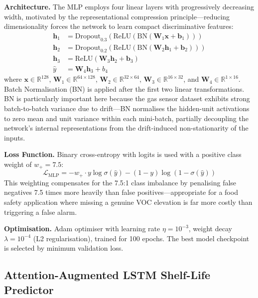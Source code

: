 \documentclass{ieeeaccess}
\begin{document}
\textbf{Architecture.} The MLP employs four linear layers with progressively decreasing width, motivated by the representational compression principle---reducing dimensionality forces the network to learn compact discriminative features:
\begin{align}
  \mathbf{h}_1 &= \text{Dropout}_{0.3}(\text{ReLU}(\text{BN}(\mathbf{W}_1 \mathbf{x} + \mathbf{b}_1))) \nonumber \\
  \mathbf{h}_2 &= \text{Dropout}_{0.2}(\text{ReLU}(\text{BN}(\mathbf{W}_2 \mathbf{h}_1 + \mathbf{b}_2))) \nonumber \\
  \mathbf{h}_3 &= \text{ReLU}(\mathbf{W}_3 \mathbf{h}_2 + \mathbf{b}_3) \nonumber \\
  \hat{y} &= \mathbf{W}_4 \mathbf{h}_3 + b_4
\end{align}
where $\mathbf{x} \in \mathbb{R}^{128}$, $\mathbf{W}_1 \in \mathbb{R}^{64 \times 128}$, $\mathbf{W}_2 \in \mathbb{R}^{32 \times 64}$, $\mathbf{W}_3 \in \mathbb{R}^{16 \times 32}$, and $\mathbf{W}_4 \in \mathbb{R}^{1 \times 16}$. Batch Normalisation (BN) is applied after the first two linear transformations. BN is particularly important here because the gas sensor dataset exhibits strong batch-to-batch variance due to drift---BN normalises the hidden-unit activations to zero mean and unit variance within each mini-batch, partially decoupling the network's internal representations from the drift-induced non-stationarity of the inputs.

\textbf{Loss Function.} Binary cross-entropy with logits is used with a positive class weight of $w_+ = 7.5$:
\begin{equation}
  \mathcal{L}_{\text{MLP}} = -w_+ \cdot y \log \sigma(\hat{y}) - (1-y)\log(1-\sigma(\hat{y}))
\end{equation}
This weighting compensates for the 7.5:1 class imbalance by penalising false negatives 7.5 times more heavily than false positives---appropriate for a food safety application where missing a genuine VOC elevation is far more costly than triggering a false alarm.

\textbf{Optimisation.} Adam optimiser with learning rate $\eta = 10^{-3}$, weight decay $\lambda = 10^{-4}$ (L2 regularisation), trained for 100 epochs. The best model checkpoint is selected by minimum validation loss.

\subsection{Attention-Augmented LSTM Shelf-Life Predictor}
\end{document}
